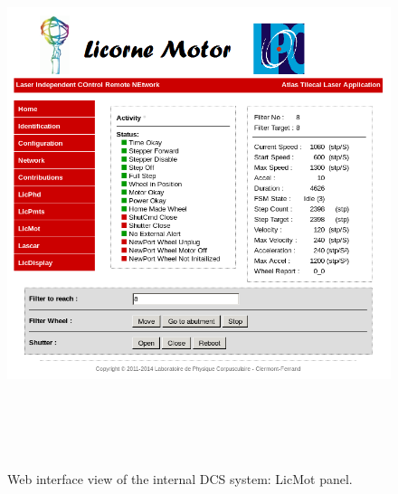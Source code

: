\begin{appendices}
\begin{figure}[htbp]
\centering
\includegraphics[height=16cm]{figures/licorne_web3.png}
\caption{Web interface view of the internal DCS system: LicMot panel.}\label{fig:licorne_webb}
\end{figure}


\end{appendices}
